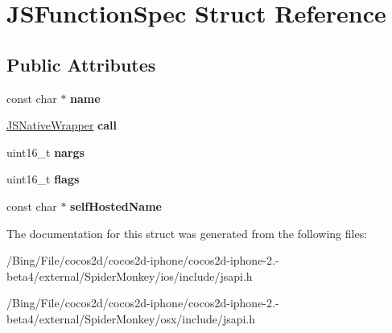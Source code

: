\hypertarget{struct_j_s_function_spec}{\section{J\-S\-Function\-Spec Struct Reference}
\label{struct_j_s_function_spec}
}
\subsection*{Public Attributes}
\begin{DoxyCompactItemize}
\item 
\hypertarget{struct_j_s_function_spec_a95f79d3fe6400389e2a5eb8feee0e004}{const char $\ast$ {\bfseries name}}\label{struct_j_s_function_spec_a95f79d3fe6400389e2a5eb8feee0e004}

\item 
\hypertarget{struct_j_s_function_spec_a5c7d935b37a07bcd1f22d87211c797be}{\hyperlink{struct_j_s_native_wrapper}{J\-S\-Native\-Wrapper} {\bfseries call}}\label{struct_j_s_function_spec_a5c7d935b37a07bcd1f22d87211c797be}

\item 
\hypertarget{struct_j_s_function_spec_ac09d199aaa8dbd980cc9b3bdb9c82a80}{uint16\-\_\-t {\bfseries nargs}}\label{struct_j_s_function_spec_ac09d199aaa8dbd980cc9b3bdb9c82a80}

\item 
\hypertarget{struct_j_s_function_spec_a964621e2b03360280b4c65e62146b46d}{uint16\-\_\-t {\bfseries flags}}\label{struct_j_s_function_spec_a964621e2b03360280b4c65e62146b46d}

\item 
\hypertarget{struct_j_s_function_spec_a6393ec167c419bd7fcebe82050041ecd}{const char $\ast$ {\bfseries self\-Hosted\-Name}}\label{struct_j_s_function_spec_a6393ec167c419bd7fcebe82050041ecd}

\end{DoxyCompactItemize}


The documentation for this struct was generated from the following files\-:\begin{DoxyCompactItemize}
\item 
/\-Bing/\-File/cocos2d/cocos2d-\/iphone/cocos2d-\/iphone-\/2.-\/beta4/external/\-Spider\-Monkey/ios/include/jsapi.\-h\item 
/\-Bing/\-File/cocos2d/cocos2d-\/iphone/cocos2d-\/iphone-\/2.-\/beta4/external/\-Spider\-Monkey/osx/include/jsapi.\-h\end{DoxyCompactItemize}
